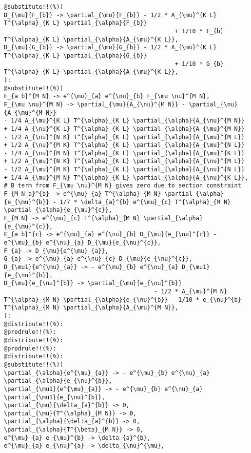 \documentclass[11pt]{article}
\begin{document}
{\color[named]{Blue}\begin{verbatim}
@substitute!!(%)(
D_{\mu}{F_{b}} -> \partial_{\mu}{F_{b}} - 1/2 * A_{\mu}^{K L} T^{\alpha}_{K L} \partial_{\alpha}{F_{b}}
                                                 + 1/10 * F_{b} T^{\alpha}_{K L} \partial_{\alpha}{A_{\mu}^{K L}},
D_{\mu}{G_{b}} -> \partial_{\mu}{G_{b}} - 1/2 * A_{\mu}^{K L} T^{\alpha}_{K L} \partial_{\alpha}{G_{b}}
                                                 + 1/10 * G_{b} T^{\alpha}_{K L} \partial_{\alpha}{A_{\mu}^{K L}},
):
@substitute!!(%)(
F_{a b}^{M N} -> e^{\mu}_{a} e^{\nu}_{b} F_{\mu \nu}^{M N},
F_{\mu \nu}^{M N} -> \partial_{\mu}{A_{\nu}^{M N}} - \partial_{\nu}{A_{\mu}^{M N}}
- 1/4 A_{\mu}^{K L} T^{\alpha}_{K L} \partial_{\alpha}{A_{\nu}^{M N}} + 1/4 A_{\nu}^{K L} T^{\alpha}_{K L} \partial_{\alpha}{A_{\mu}^{M N}}
- 1/2 A_{\nu}^{N K} T^{\alpha}_{K L} \partial_{\alpha}{A_{\mu}^{M L}} + 1/2 A_{\nu}^{M K} T^{\alpha}_{K L} \partial_{\alpha}{A_{\mu}^{N L}}
- 1/4 A_{\nu}^{M N} T^{\alpha}_{K L} \partial_{\alpha}{A_{\mu}^{K L}} + 1/2 A_{\mu}^{N K} T^{\alpha}_{K L} \partial_{\alpha}{A_{\nu}^{M L}}
- 1/2 A_{\mu}^{M K} T^{\alpha}_{K L} \partial_{\alpha}{A_{\nu}^{N L}} + 1/4 A_{\mu}^{M N} T^{\alpha}_{K L} \partial_{\alpha}{A_{\nu}^{K L}},
# B term from F_{\mu \nu}^{M N} gives zero due to section constraint
F_{M N a}^{b} -> e^{\mu}_{a} T^{\alpha}_{M N} \partial_{\alpha}{e_{\mu}^{b}} - 1/7 * \delta_{a}^{b} e^{\mu}_{c} T^{\alpha}_{M N} \partial_{\alpha}{e_{\mu}^{c}},
F_{M N} -> e^{\mu}_{c} T^{\alpha}_{M N} \partial_{\alpha}{e_{\mu}^{c}},
F_{a b}^{c} -> e^{\mu}_{a} e^{\nu}_{b} D_{\mu}{e_{\nu}^{c}} - e^{\mu}_{b} e^{\nu}_{a} D_{\mu}{e_{\nu}^{c}},
F_{a} -> D_{\mu}{e^{\mu}_{a}},
G_{a} -> e^{\mu}_{a} e^{\nu}_{c} D_{\mu}{e_{\nu}^{c}},
D_{\mu1}{e^{\mu}_{a}} -> - e^{\mu}_{b} e^{\nu}_{a} D_{\mu1}{e_{\nu}^{b}},
D_{\mu}{e_{\nu}^{b}} -> \partial_{\mu}{e_{\nu}^{b}} 
                                           - 1/2 * A_{\mu}^{M N} T^{\alpha}_{M N} \partial_{\alpha}{e_{\nu}^{b}} - 1/10 * e_{\nu}^{b} T^{\alpha}_{M N} \partial_{\alpha}{A_{\mu}^{M N}},
):
@distribute!!(%):
@prodrule!!(%):
@distribute!!(%):
@prodrule!!(%):
@distribute!!(%):
@substitute!!(%)(
\partial_{\alpha}{e^{\mu}_{a}} -> - e^{\mu}_{b} e^{\nu}_{a} \partial_{\alpha}{e_{\nu}^{b}},
\partial_{\mu1}{e^{\mu}_{a}} -> - e^{\mu}_{b} e^{\nu}_{a} \partial_{\mu1}{e_{\nu}^{b}},
\partial_{\mu}{\delta_{a}^{b}} -> 0,
\partial_{\mu}{T^{\alpha}_{M N}} -> 0,
\partial_{\alpha}{\delta_{a}^{b}} -> 0,
\partial_{\alpha}{T^{\beta}_{M N}} -> 0,
e^{\mu}_{a} e_{\mu}^{b} -> \delta_{a}^{b},
e^{\mu}_{a} e_{\nu}^{a} -> \delta_{\nu}^{\mu},

\end{verbatim}}
\end{document}
